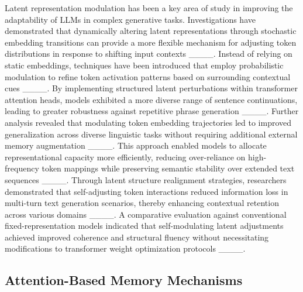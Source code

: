 Latent representation modulation has been a key area of study in improving the adaptability of LLMs in complex generative tasks. Investigations have demonstrated that dynamically altering latent representations through stochastic embedding transitions can provide a more flexible mechanism for adjusting token distributions in response to shifting input contexts ____. Instead of relying on static embeddings, techniques have been introduced that employ probabilistic modulation to refine token activation patterns based on surrounding contextual cues ____. By implementing structured latent perturbations within transformer attention heads, models exhibited a more diverse range of sentence continuations, leading to greater robustness against repetitive phrase generation ____. Further analysis revealed that modulating token embedding trajectories led to improved generalization across diverse linguistic tasks without requiring additional external memory augmentation ____. This approach enabled models to allocate representational capacity more efficiently, reducing over-reliance on high-frequency token mappings while preserving semantic stability over extended text sequences ____. Through latent structure realignment strategies, researchers demonstrated that self-adjusting token interactions reduced information loss in multi-turn text generation scenarios, thereby enhancing contextual retention across various domains ____. A comparative evaluation against conventional fixed-representation models indicated that self-modulating latent adjustments achieved improved coherence and structural fluency without necessitating modifications to transformer weight optimization protocols ____.

\subsection{Attention-Based Memory Mechanisms}

